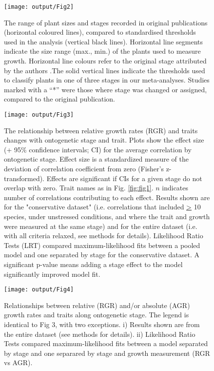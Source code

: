 \documentclass[a4paper,11pt]{article}
\begin{document}
\begin{figure}[h!]
\centering
\texttt{[image: output/Fig2]}
\caption{The range of plant sizes and stages recorded in original publications (horizontal coloured lines), compared to standardised thresholds used in the analysis (vertical black lines). Horizontal line segments indicate the size range (max., min.) of the plants used to measure growth. Horizontal line colours refer to the original stage attributed by the authors .The solid vertical lines indicate the thresholds used to classify plants in one of three stages in our meta-analyses. Studies marked with a ``*'' were those where stage was changed or assigned, compared to the original publication.}
\label{fig:fig2}
\end{figure}



\begin{figure}[h!]
\centering
\texttt{[image: output/Fig3]}
\caption{The relationship between relative growth rates (RGR) and traits changes with ontogenetic stage and trait. Plots show the effect size (+ 95\% confidence intervals; CI) for the average correlation by ontogenetic stage. Effect size is a standardized measure of the deviation of correlation coefficient from zero (Fisher's z-transformed). Effects are significant if CIs for a given stage do not overlap with zero. Trait names as in Fig. \ref{fig:fig1}. $n$ indicates number of correlations contributing to each effect. Results shown are for the "conservative dataset" (i.e. correlations that included \underline{\textgreater} 10 species, under unstressed conditions, and where the trait and growth were measured at the same stage) and for the entire dataset (i.e. with all criteria relaxed, see methods for details). Likelihood Ratio Tests (LRT) compared maximum-likelihood fits between a pooled model and one separated by stage for the conservative dataset. A significant p-value means adding a stage effect to the model significantly improved model fit.}
\label{fig:fig3}
\end{figure}


\begin{figure}[h!]
\centering
\texttt{[image: output/Fig4]}
\caption{Relationships between relative (RGR) and/or absolute (AGR) growth rates and traits along ontogenetic stage. The legend is identical to Fig 3, with two exceptions. i) Results shown are from the entire dataset (see methods for details). ii) Likelihood Ratio Tests compared maximum-likelihood fits between a model separated by stage and one separared by stage and growth measurement (RGR vs AGR).}
\label{fig:fig4}
\end{figure}
\end{document}
